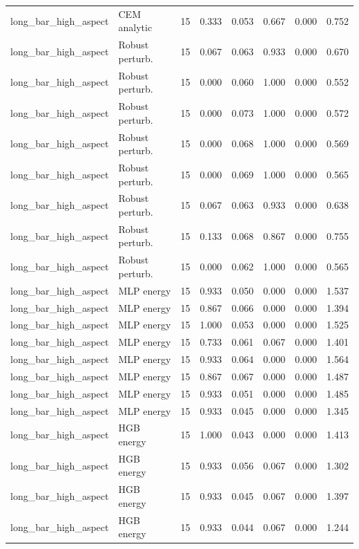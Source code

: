 {\begin{longtable}{llrrrrrr}
long\_bar\_high\_aspect & CEM analytic & 15 & 0.333 & 0.053 & 0.667 & 0.000 & 0.752 \\
long\_bar\_high\_aspect & Robust perturb. & 15 & 0.067 & 0.063 & 0.933 & 0.000 & 0.670 \\
long\_bar\_high\_aspect & Robust perturb. & 15 & 0.000 & 0.060 & 1.000 & 0.000 & 0.552 \\
long\_bar\_high\_aspect & Robust perturb. & 15 & 0.000 & 0.073 & 1.000 & 0.000 & 0.572 \\
long\_bar\_high\_aspect & Robust perturb. & 15 & 0.000 & 0.068 & 1.000 & 0.000 & 0.569 \\
long\_bar\_high\_aspect & Robust perturb. & 15 & 0.000 & 0.069 & 1.000 & 0.000 & 0.565 \\
long\_bar\_high\_aspect & Robust perturb. & 15 & 0.067 & 0.063 & 0.933 & 0.000 & 0.638 \\
long\_bar\_high\_aspect & Robust perturb. & 15 & 0.133 & 0.068 & 0.867 & 0.000 & 0.755 \\
long\_bar\_high\_aspect & Robust perturb. & 15 & 0.000 & 0.062 & 1.000 & 0.000 & 0.565 \\
long\_bar\_high\_aspect & MLP energy & 15 & 0.933 & 0.050 & 0.000 & 0.000 & 1.537 \\
long\_bar\_high\_aspect & MLP energy & 15 & 0.867 & 0.066 & 0.000 & 0.000 & 1.394 \\
long\_bar\_high\_aspect & MLP energy & 15 & 1.000 & 0.053 & 0.000 & 0.000 & 1.525 \\
long\_bar\_high\_aspect & MLP energy & 15 & 0.733 & 0.061 & 0.067 & 0.000 & 1.401 \\
long\_bar\_high\_aspect & MLP energy & 15 & 0.933 & 0.064 & 0.000 & 0.000 & 1.564 \\
long\_bar\_high\_aspect & MLP energy & 15 & 0.867 & 0.067 & 0.000 & 0.000 & 1.487 \\
long\_bar\_high\_aspect & MLP energy & 15 & 0.933 & 0.051 & 0.000 & 0.000 & 1.485 \\
long\_bar\_high\_aspect & MLP energy & 15 & 0.933 & 0.045 & 0.000 & 0.000 & 1.345 \\
long\_bar\_high\_aspect & HGB energy & 15 & 1.000 & 0.043 & 0.000 & 0.000 & 1.413 \\
long\_bar\_high\_aspect & HGB energy & 15 & 0.933 & 0.056 & 0.067 & 0.000 & 1.302 \\
long\_bar\_high\_aspect & HGB energy & 15 & 0.933 & 0.045 & 0.067 & 0.000 & 1.397 \\
long\_bar\_high\_aspect & HGB energy & 15 & 0.933 & 0.044 & 0.067 & 0.000 & 1.244 \\

\end{longtable}}
